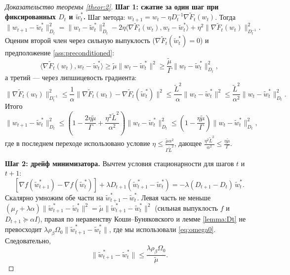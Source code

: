 \begin{proof}[Доказательство теоремы \ref{theor:2}]
\textbf{Шаг 1: сжатие за один шаг при фиксированных $D_t$ и $\widetilde{w}^*_t$.}
Шаг метода: $w_{t+1} = w_t - \eta D_t^{-1} \nabla \widetilde{F}_t(w_t)$. Тогда
\begin{equation*}
    \|w_{t+1}-\widetilde{w}^*_t\|_{D_t}^2 = \|w_t - \widetilde{w}^*_t\|_{D_t}^2 - 2 \eta \langle \nabla \widetilde{F}_t(w_t), w_t - \widetilde{w}^*_t \rangle + \eta^2 \|\nabla \widetilde{F}_t(w_t)\|_{D_t^{-1}}^2.
\end{equation*}
Оценим второй член через сильную выпуклость ($\nabla \widetilde{F}_t(\widetilde{w}^*_t) = 0$) и предположение \ref{ass:preconditioned}:
\begin{equation*}
    \langle \nabla \widetilde{F}_t(w_t), w_t - \widetilde{w}^*_t \rangle \ge \widetilde{\mu} \|w_t - \widetilde{w}^*_t\|^2 \ge \frac{\widetilde{\mu}}{\Gamma} \|w_t - \widetilde{w}^*_t\|_{D_t}^2,
\end{equation*}
а третий --- через липшицевость градиента:
\begin{equation*}
    \|\nabla \widetilde{F}_t(w_t)\|_{D_t^{-1}}^2 \le \frac{1}{\alpha}\|\nabla \widetilde{F}_t(w_t) - \nabla \widetilde{F}_t(\widetilde{w}^*_t)\|^2 \le \frac{\widetilde{L}^2}{\alpha}\|w_t - \widetilde{w}^*_t\|^2 \le \frac{\widetilde{L}^2}{\alpha^2}\|w_t - \widetilde{w}^*_t\|_{D_t}^2.
\end{equation*}
Итого
\begin{equation*}
    \|w_{t+1}-\widetilde{w}^*_t\|_{D_t}^2 \le \left(1 - \frac{2\eta\widetilde{\mu}}{\Gamma} + \frac{\eta^2 \widetilde{L}^2}{\alpha^2}\right) \|w_t - \widetilde{w}^*_t\|_{D_t}^2 \le \left(1 - \frac{\eta\widetilde{\mu}}{\Gamma}\right) \|w_t - \widetilde{w}^*_t\|_{D_t}^2,
\end{equation*}
где в последнем переходе использовано условие $\eta \le \frac{\widetilde{\mu}\alpha^2}{\Gamma \widetilde{L}^2}$, дающее $\frac{\eta^2\widetilde{L}^2}{\alpha^2} \le \frac{\eta\widetilde{\mu}}{\Gamma}$.

\textbf{Шаг 2: дрейф минимизатора.}
Вычтем условия стационарности для шагов $t$ и $t+1$:
\begin{equation*}
    \left[\nabla f(\widetilde{w}^*_{t+1}) - \nabla f(\widetilde{w}^*_t)\right] + \lambda D_{t+1}\left(\widetilde{w}^*_{t+1} - \widetilde{w}^*_t\right) = -\lambda (D_{t+1} - D_t)\, \widetilde{w}^*_t.
\end{equation*}
Скалярно умножим обе части на $\widetilde{w}^*_{t+1} - \widetilde{w}^*_t$. Левая часть не меньше $(\mu_f + \lambda\alpha)\|\widetilde{w}^*_{t+1} - \widetilde{w}^*_t\|^2 = \widetilde{\mu}\|\widetilde{w}^*_{t+1} - \widetilde{w}^*_t\|^2$ (сильная выпуклость $f$ и $D_{t+1} \succcurlyeq \alpha I$), правая по неравенству Коши--Буняковского и лемме \ref{lemma:Dt} не превосходит $\lambda \rho_\beta \Omega_0 \|\widetilde{w}^*_{t+1} - \widetilde{w}^*_t\|$, где мы использовали \eqref{eq:omega0}. Следовательно,
\begin{equation}
\label{eq:drift}
    \|\widetilde{w}^*_{t+1} - \widetilde{w}^*_t\| \le \frac{\lambda \rho_\beta \Omega_0}{\widetilde{\mu}}.
\end{equation}


\end{proof}
